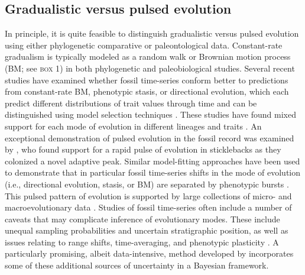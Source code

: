 \subsection{Gradualistic versus pulsed evolution}

In principle, it is quite feasible to distinguish gradualistic versus pulsed evolution using either phylogenetic comparative or paleontological data. Constant-rate gradualism is typically modeled as a random walk or Brownian motion process (BM; see \textsc{box 1}) in both phylogenetic and paleobiological studies. Several recent studies have examined whether fossil time-series conform better to predictions from constant-rate BM, phenotypic stasis, or directional evolution, which each predict different distributions of trait values through time and can be distinguished using model selection techniques \citep{Hunt2012}. These studies have found mixed support for each mode of evolution in different lineages and traits \citep{Hunt2007, Huntetal2008, Hunt2008, Grey2008, Hopkins2012, Hunt2012}. An exceptional demonstration of pulsed evolution in the fossil record was examined by \citet{Huntetal2008}, who found support for a rapid pulse of evolution in sticklebacks as they colonized a novel adaptive peak. Similar model-fitting approaches have been used to demonstrate that in particular fossil time-series shifts in the mode of evolution (i.e., directional evolution, stasis, or BM) are separated by phenotypic bursts \citep{Hunt2008}. This pulsed pattern of evolution is supported by large collections of micro- and macroevolutionary data \citep{EstesArnold2007, Uyeda2011}. Studies of fossil time-series often include a number of caveats that may complicate inference of evolutionary modes. These include unequal sampling probabilities and uncertain stratigraphic position, as well as issues relating to range shifts, time-averaging, and phenotypic plasticity \citep{StratPaleobook}. A particularly promising, albeit data-intensive, method developed by \citet{Hannisdal2007} incorporates some of these additional sources of uncertainty in a Bayesian framework.

